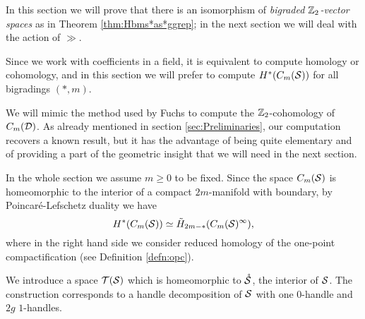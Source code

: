 
In this section we will prove that there is an isomorphism of \emph{bigraded $\Z_2$-vector spaces}
as in Theorem \ref{thm:Hbms*as*ggrep}; in the next section we will deal with the action of
$\gg$.

Since we work with coefficients in a field, it is equivalent to compute homology or cohomology,
and in this section we will prefer to compute $H^*(\cms)$ for all bigradings $(*,m)$.

We will mimic the method used by Fuchs \cite{Fuchs:CohomBraidModtwo} to compute the $\Z_2$-cohomology
of $C_m(\D)$.
As already mentioned in section \ref{sec:Preliminaries}, our computation recovers a known result, but it has the advantage of
being quite elementary and of providing a part of
the geometric insight that we will need in the next section.

In the whole section we assume $m\geq 0$ to be fixed.
Since the space $\cms$ is homeomorphic to the interior of a compact
$2m$-manifold with boundary, by Poincaré-Lefschetz
duality we have
\[
 H^*(\cms)\simeq \tilde H_{2m-*}(\cms^{\infty}),
\]
where in the right hand side we consider reduced homology of the one-point compactification (see Definition \ref{defn:opc}).

We introduce a space $\T(\S)$ which is homeomorphic to $\mrS$, the interior of $\S$. The construction
corresponds to a handle decomposition of $\S$ with one $0$-handle and $2g$ $1$-handles.

